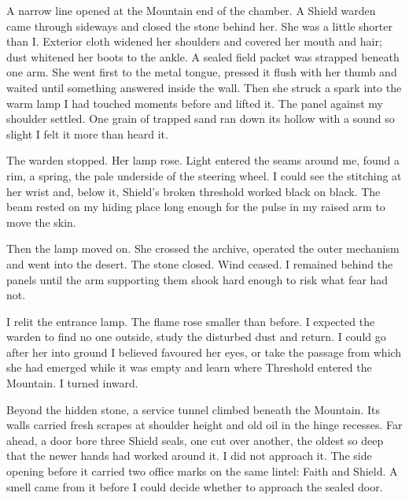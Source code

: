 A narrow line opened at the Mountain end of the chamber. A Shield warden came through sideways and closed the stone behind her. She was a little shorter than I. Exterior cloth widened her shoulders and covered her mouth and hair; dust whitened her boots to the ankle. A sealed field packet was strapped beneath one arm. She went first to the metal tongue, pressed it flush with her thumb and waited until something answered inside the wall. Then she struck a spark into the warm lamp I had touched moments before and lifted it. The panel against my shoulder settled. One grain of trapped sand ran down its hollow with a sound so slight I felt it more than heard it.\par

The warden stopped. Her lamp rose. Light entered the seams around me, found a rim, a spring, the pale underside of the steering wheel. I could see the stitching at her wrist and, below it, Shield's broken threshold worked black on black. The beam rested on my hiding place long enough for the pulse in my raised arm to move the skin.\par

Then the lamp moved on. She crossed the archive, operated the outer mechanism and went into the desert. The stone closed. Wind ceased. I remained behind the panels until the arm supporting them shook hard enough to risk what fear had not.\par

I relit the entrance lamp. The flame rose smaller than before. I expected the warden to find no one outside, study the disturbed dust and return. I could go after her into ground I believed favoured her eyes, or take the passage from which she had emerged while it was empty and learn where Threshold entered the Mountain. I turned inward.\par

\ornament

Beyond the hidden stone, a service tunnel climbed beneath the Mountain. Its walls carried fresh scrapes at shoulder height and old oil in the hinge recesses. Far ahead, a door bore three Shield seals, one cut over another, the oldest so deep that the newer hands had worked around it. I did not approach it. The side opening before it carried two office marks on the same lintel: Faith and Shield. A smell came from it before I could decide whether to approach the sealed door.\par

